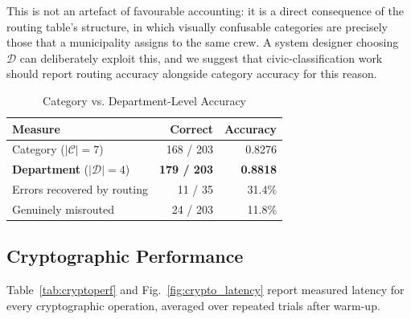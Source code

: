 \documentclass[conference]{IEEEtran}
\begin{document}
This is not an artefact of favourable accounting: it is a direct consequence of the routing table's structure, in which visually confusable categories are precisely those that a municipality assigns to the same crew. A system designer choosing $\mathcal{D}$ can deliberately exploit this, and we suggest that civic-classification work should report routing accuracy alongside category accuracy for this reason.

\begin{table}[t]
\caption{Category vs. Department-Level Accuracy}
\label{tab:deptacc}
\centering
\small
\begin{tabular}{lrr}
\toprule
\textbf{Measure} & \textbf{Correct} & \textbf{Accuracy} \\
\midrule
Category ($|\mathcal{C}| = 7$)      & 168 / 203 & 0.8276 \\
\textbf{Department} ($|\mathcal{D}| = 4$) & \textbf{179 / 203} & \textbf{0.8818} \\
\midrule
Errors recovered by routing         & 11 / 35 & 31.4\% \\
Genuinely misrouted                 & 24 / 203 & 11.8\% \\
\bottomrule
\end{tabular}
\end{table}

\subsection{Cryptographic Performance}
\label{sec:cryptoperf}
Table~\ref{tab:cryptoperf} and Fig.~\ref{fig:crypto_latency} report measured latency for every cryptographic operation, averaged over repeated trials after warm-up.
\end{document}
